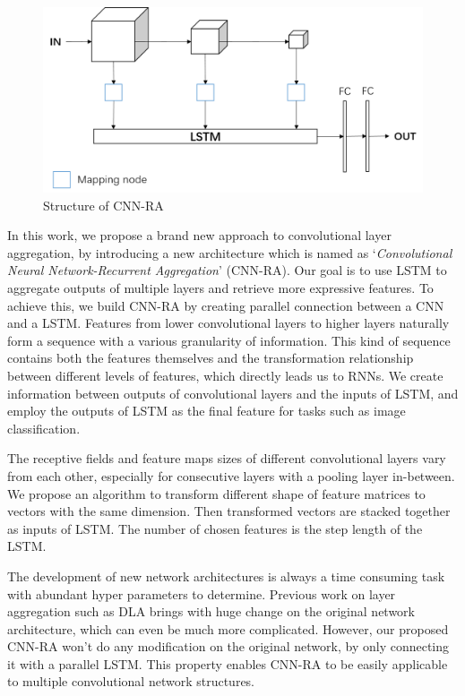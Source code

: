 \documentclass[conference]{IEEEtran}
\begin{document}
\begin{figure}  
	\centering
	\includegraphics[width=12cm]{Figures/CNN-RA.png}
	\caption{Structure of CNN-RA}
	\label{fig:CNN-RA}
\end{figure}

In this work, we propose a brand new approach to convolutional layer aggregation, by introducing a new architecture which is named as `\emph{Convolutional Neural Network-Recurrent Aggregation}' (CNN-RA).  Our goal is to use LSTM to aggregate outputs of multiple layers and retrieve more expressive features. To achieve this, we build CNN-RA by creating parallel connection between a CNN and a LSTM. Features from lower convolutional layers to higher layers naturally form a sequence with a various granularity of information. This kind of sequence contains both the features themselves and the transformation relationship between different levels of features, which directly leads us to RNNs. We create information between outputs of convolutional layers and the inputs of LSTM, and employ the outputs of LSTM as the final feature for tasks such as image classification.

The receptive fields and feature maps sizes of different convolutional layers vary from each other, especially for consecutive layers with a pooling layer in-between. We propose an algorithm to transform different shape of feature matrices to vectors with the same dimension. Then transformed vectors are stacked together as inputs of LSTM. The number of chosen features is the step length of the LSTM.

The development of new network architectures is always a time consuming task with abundant hyper parameters to determine. Previous work on layer aggregation such as DLA\cite{dla} brings with huge change on the original network architecture, which can even be much more complicated. However, our proposed CNN-RA won't do any modification on the original network, by only connecting it with a parallel LSTM. This property enables CNN-RA to be easily applicable to multiple convolutional network structures. 
\end{document}
